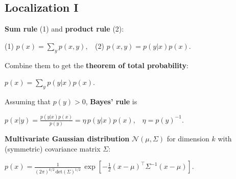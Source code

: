 \documentclass[landscape]{article}
\newcommand{\vmspace}{\vspace{-7pt}}
\newcommand{\vpspace}{\vspace{5pt}}
\begin{document}
\begin{multicols}{3}
\vspace{7cm}


\vfill


\section{Localization I}

\vmspace


\begin{minipage}{\columnwidth}
  \textbf{Sum rule} (1) and \textbf{product rule} (2):
  \vmspace
  \begin{center}
    (1) $p(x) = \sum_y p(x,y),\;\;$
    (2) $p(x, y) = p(y | x) p(x)$.
  \end{center}
\end{minipage}

\vpspace

\begin{minipage}{\columnwidth}
  Combine them to get the \textbf{theorem of total probability}:
  \vmspace
  \begin{center}
    $p(x) = \sum_y p(y | x) p(x).$
  \end{center}
\end{minipage}

\vpspace

\begin{minipage}{\columnwidth}
  Assuming that $p(y) > 0$, \textbf{Bayes' rule} is
  \vmspace
  \begin{center}
    $p(x|y) = \frac{p(y|x)p(x)}{p(y)} = \eta\, p(y|x)p(x),\;\;\;
    \eta = p(y)^{-1}.$
  \end{center}
\end{minipage}

\vpspace

\begin{minipage}{\columnwidth}
  \textbf{Multivariate Gaussian distribution} $\mathcal N(\mu, \Sigma)$ for
  dimension $k$ with (symmetric) covariance matrix $\Sigma$:
  \vmspace
  \begin{center}
    $
    p(x)
    =
    \frac{1}{(2\pi)^{k/2}\,\mathrm{det}(\Sigma)^{1/2}}\,
    \exp\left[
    -\frac{1}{2}(x-\mu)^\intercal \Sigma^{-1} (x-\mu)
    \right].
    $
  \end{center}
\end{minipage}

\vpspace


\end{multicols}
\end{document}
